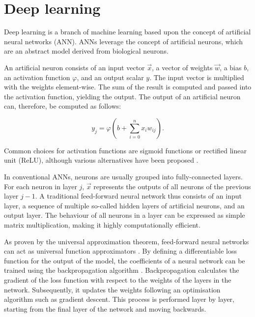 \documentclass{l4proj}
\begin{document}

\section{Deep learning}

Deep learning is a branch of machine learning based upon the concept of artificial neural networks (ANN). ANNs leverage the concept of artificial neurons, which are an abstract model derived from biological neurons. 

An artificial neuron consists of an input vector $\vec{x}$, a vector of weights $\vec{w}$, a bias $b$, an activation function $\varphi$, and an output scalar $y$. The input vector is multiplied with the weights element-wise. The sum of the result is computed and passed into the activation function, yielding the output. The output of an artificial neuron can, therefore, be computed as follows:

\begin{equation}
  y_j = \varphi (b + \sum_{i=0}^n x_i w_{ij}).
\end{equation}

Common choices for activation functions are sigmoid functions or rectified linear unit (ReLU), although various alternatives have been proposed \citep{ramachandran_searching_2017}.

In conventional ANNs, neurons are usually grouped into fully-connected layers. For each neuron in layer $j$, $\vec{x}$ represents the outputs of all neurons of the previous layer $j-1$. A traditional feed-forward neural network thus consists of an input layer, a sequence of multiple so-called hidden layers of artificial neurons, and an output layer. The behaviour of all neurons in a layer can be expressed as simple matrix multiplication, making it highly computationally efficient.

As proven by the universal approximation theorem, feed-forward neural networks can act as universal function approximators \citep{hornik_approximation_1991}. By defining a differentiable loss function for the output of the model, the coefficients of a neural network can be trained using the backpropagation algorithm \citep{rumelhart_learning_1986}. Backpropagation calculates the gradient of the loss function with respect to the weights of the layers in the network. Subsequently, it updates the weights following an optimisation algorithm such as gradient descent. This process is performed layer by layer, starting from the final layer of the network and moving backwards.
\end{document}
